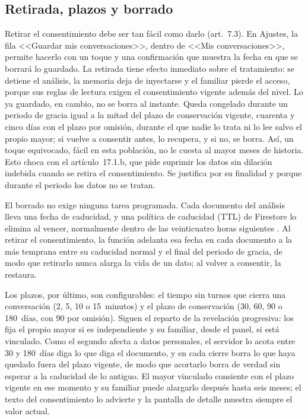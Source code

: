\subsection{Retirada, plazos y borrado}

Retirar el consentimiento debe ser tan fácil como darlo (art.~7.3). En Ajustes, la fila <<Guardar mis conversaciones>>, dentro de <<Mis conversaciones>>, permite hacerlo con un toque y una confirmación que muestra la fecha en que se borrará lo guardado. La retirada tiene efecto inmediato sobre el tratamiento: se detiene el análisis, la memoria deja de inyectarse y el familiar pierde el acceso, porque sus reglas de lectura exigen el consentimiento vigente además del nivel. Lo ya guardado, en cambio, no se borra al instante. Queda congelado durante un periodo de gracia igual a la mitad del plazo de conservación vigente, cuarenta y cinco días con el plazo por omisión, durante el que nadie lo trata ni lo lee salvo el propio mayor; si vuelve a consentir antes, lo recupera, y si no, se borra. Así, un toque equivocado, fácil en esta población, no le cuesta al mayor meses de historia. Esto choca con el artículo~17.1.b, que pide suprimir los datos sin dilación indebida cuando se retira el consentimiento. Se justifica por su finalidad y porque durante el periodo los datos no se tratan.

El borrado no exige ninguna tarea programada. Cada documento del análisis lleva una fecha de caducidad, y una política de caducidad (TTL) de Firestore lo elimina al vencer, normalmente dentro de las veinticuatro horas siguientes \citep{FirestoreTTL}. Al retirar el consentimiento, la función adelanta esa fecha en cada documento a la más temprana entre su caducidad normal y el final del periodo de gracia, de modo que retirarlo nunca alarga la vida de un dato; al volver a consentir, la restaura.

Los plazos, por último, son configurables: el tiempo sin turnos que cierra una conversación (2, 5, 10 o 15~minutos) y el plazo de conservación (30, 60, 90 o 180~días, con 90 por omisión). Siguen el reparto de la revelación progresiva: los fija el propio mayor si es independiente y su familiar, desde el panel, si está vinculado. Como el segundo afecta a datos personales, el servidor lo acota entre 30 y 180~días diga lo que diga el documento, y en cada cierre borra lo que haya quedado fuera del plazo vigente, de modo que acortarlo borra de verdad sin esperar a la caducidad de lo antiguo. El mayor vinculado consiente con el plazo vigente en ese momento y su familiar puede alargarlo después hasta seis meses; el texto del consentimiento lo advierte y la pantalla de detalle muestra siempre el valor actual.

